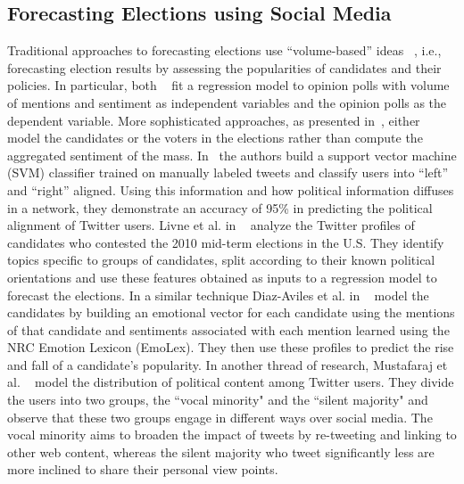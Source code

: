 \subsection{Forecasting Elections using Social Media}
Traditional approaches to forecasting elections use ``volume-based'' ideas
~\cite{tumasjan2010predicting,o2010tweets,saez2011total,bermingham2011using}, 
i.e., forecasting election results by assessing the popularities of candidates and their policies.
In particular, both ~\cite{o2010tweets,bermingham2011using} fit a regression model to opinion 
polls with volume of mentions and sentiment as independent variables and the opinion 
polls as the dependent variable. 
More sophisticated approaches, as presented in~\cite{livne2011party,conover2011predicting,diaz2012taking},
either model the candidates or the voters in the elections rather than compute the aggregated sentiment of the mass.  
In~\cite{conover2011predicting} the authors build a support vector machine (SVM)
classifier trained on manually labeled tweets and classify users into ``left'' and ``right'' aligned.
Using this information and how political information diffuses in a network, they demonstrate an accuracy of 95\%  in 
predicting the political alignment of Twitter users.
Livne et al. in ~\cite{livne2011party} analyze the Twitter profiles of candidates who contested 
the 2010 mid-term elections in the U.S. 
They identify topics specific to groups of candidates, split according to their known political orientations and use 
these features obtained as inputs to a regression model to forecast the elections. 
In a similar technique Diaz-Aviles et al. in ~\cite{diaz2012taking} model the candidates by building an emotional vector 
for each candidate using the mentions of that candidate and sentiments associated with each mention learned using 
the NRC Emotion Lexicon (EmoLex). 
They then use %
these profiles to predict the rise and fall of a candidate's popularity.
In another thread of research, Mustafaraj et al. ~\cite{mustafaraj2011vocal} model the distribution of political content 
among Twitter users. 
They divide the users into two groups, the ``vocal minority" and the ``silent majority" and
observe that these two groups engage in different ways over social media.
The vocal minority aims to broaden the impact of tweets by re-tweeting and linking to other web content, whereas 
the silent majority who tweet significantly less are more inclined to share their personal view points.

